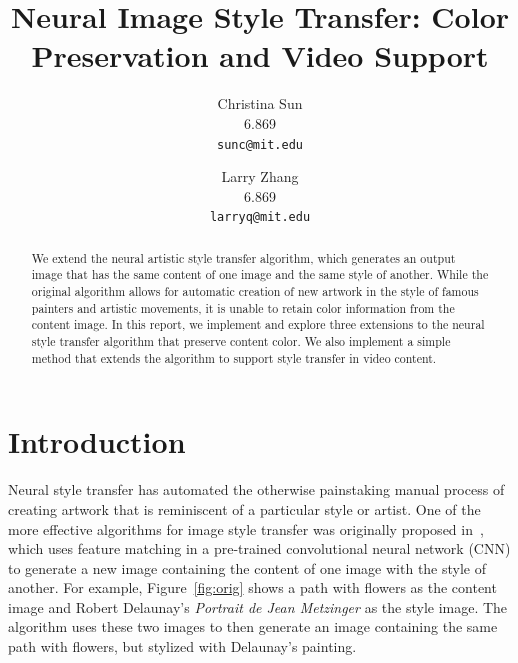 \documentclass[10pt,twocolumn,letterpaper]{article}
\begin{document}
\title{Neural Image Style Transfer: Color Preservation and Video Support}

\author{Christina Sun\\
6.869\\
{\tt\small sunc@mit.edu}
\and
Larry Zhang\\
6.869\\
{\tt\small larryq@mit.edu}
}

\maketitle

\begin{abstract}
  We extend the neural artistic style transfer algorithm, which generates an output image that has the same content of one image and the same style of another. While the original algorithm allows for automatic creation of new artwork in the style of famous painters and artistic movements, it is unable to retain color information from the content image. In this report, we implement and explore three extensions to the neural style transfer algorithm that preserve content color. We also implement a simple method that extends the algorithm to support style transfer in video content.
\end{abstract}

\section{Introduction}
Neural style transfer has automated the otherwise painstaking manual process of creating artwork that is reminiscent of a particular style or artist. One of the more effective algorithms for image style transfer was originally proposed in~\cite{gatys-orig}, which uses feature matching in a pre-trained convolutional neural network (CNN) to generate a new image containing the content of one image with the style of another. For example, Figure~\ref{fig:orig} shows a path with flowers as the content image and Robert Delaunay's \textit{Portrait de Jean Metzinger} as the style image. The algorithm uses these two images to then generate an image containing the same path with flowers, but stylized with Delaunay's painting.
\end{document}
